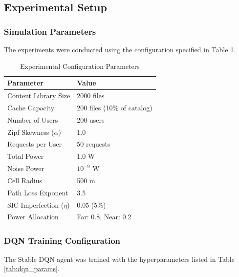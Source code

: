\documentclass[12pt,a4paper]{article}
\begin{document}
\subsection{Experimental Setup}

\subsubsection{Simulation Parameters}

The experiments were conducted using the configuration specified in Table \ref{tab:exp_params}.

\begin{table}[htbp]
\centering
\caption{Experimental Configuration Parameters}
\label{tab:exp_params}
\begin{tabular}{|l|l|}
\hline
\textbf{Parameter} & \textbf{Value} \\
\hline
Content Library Size & 2000 files \\
\hline
Cache Capacity & 200 files (10\% of catalog) \\
\hline
Number of Users & 200 users \\
\hline
Zipf Skewness ($\alpha$) & 1.0 \\
\hline
Requests per User & 50 requests \\
\hline
Total Power & 1.0 W \\
\hline
Noise Power & $10^{-9}$ W \\
\hline
Cell Radius & 500 m \\
\hline
Path Loss Exponent & 3.5 \\
\hline
SIC Imperfection ($\eta$) & 0.05 (5\%) \\
\hline
Power Allocation & Far: 0.8, Near: 0.2 \\
\hline
\end{tabular}
\end{table}

\subsubsection{DQN Training Configuration}

The Stable DQN agent was trained with the hyperparameters listed in Table \ref{tab:dqn_params}.
\end{document}
